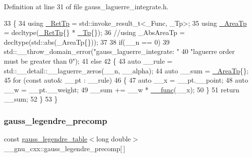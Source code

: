 Definition at line 31 of file gauss\+\_\+laguerre\+\_\+integrate.\+h.


\begin{DoxyCode}
33   \{
34     \textcolor{keyword}{using} \hyperlink{namespace____gnu__cxx_a886e03ece3d53ff7fa6c098a40f93fa5}{\_RetTp} = std::invoke\_result\_t<\_Func, \_Tp>;
35     \textcolor{keyword}{using} \hyperlink{namespace____gnu__cxx_ae97a51b75e19c30f48d27fac4664de6e}{\_AreaTp} = decltype(\hyperlink{namespace____gnu__cxx_a886e03ece3d53ff7fa6c098a40f93fa5}{\_RetTp}\{\} * \hyperlink{namespace____gnu__cxx_a3b19a9c800ca194374ef9172290f7d79}{\_Tp}\{\});
36     \textcolor{comment}{//using \_AbsAreaTp = decltype(std::abs(\_AreaTp\{\}));}
37 
38     \textcolor{keywordflow}{if}(\_\_n == 0)
39       std::\_\_throw\_domain\_error(\textcolor{stringliteral}{"gauss\_laguerre\_integrate: "}
40                                 \textcolor{stringliteral}{"laguerre order must be greater than 0"});
41     \textcolor{keywordflow}{else}
42      \{
43         \textcolor{keyword}{auto} \_\_rule = std::\_\_detail::\_\_laguerre\_zeros(\_\_n, \_\_alpha);
44         \textcolor{keyword}{auto} \_\_sum = \hyperlink{namespace____gnu__cxx_ae97a51b75e19c30f48d27fac4664de6e}{\_AreaTp}\{\};
45         \textcolor{keywordflow}{for} (\textcolor{keyword}{const} \textcolor{keyword}{auto}& \_\_pt : \_\_rule)
46           \{
47             \textcolor{keyword}{auto} \_\_x = \_\_pt.\_\_point;
48             \textcolor{keyword}{auto} \_\_w = \_\_pt.\_\_weight;
49             \_\_sum += \_\_w * \hyperlink{namespace____gnu__cxx_af2b2f0c7a2ae72b922b1afefae5a65b2}{\_\_func}(\_\_x);
50           \}
51         \textcolor{keywordflow}{return} \_\_sum;
52       \}
53   \}
\end{DoxyCode}
\mbox{\label{namespace____gnu__cxx_a2e3dcc11970f62e2c7e9d81502b2f84b}} 
\subsubsection{\texorpdfstring{gauss\+\_\+legendre\+\_\+precomp}{gauss\_legendre\_precomp}}
{\footnotesize\ttfamily const \hyperlink{struct____gnu__cxx_1_1gauss__legendre__table}{gauss\+\_\+legendre\+\_\+table}$<$long double$>$ \+\_\+\+\_\+gnu\+\_\+cxx\+::gauss\+\_\+legendre\+\_\+precomp\mbox{[}$\,$\mbox{]}}


